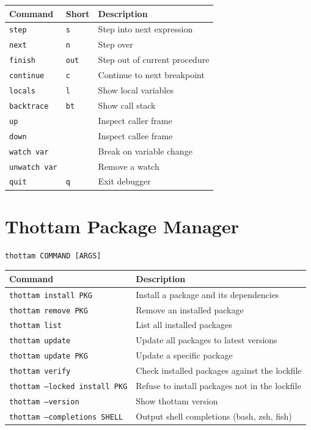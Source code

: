 \begin{center}
\small
\begin{tabularx}{\textwidth}{@{}llY@{}}
\textbf{Command} & \textbf{Short} & \textbf{Description} \\
\hline
\texttt{step} & \texttt{s} & Step into next expression \\
\texttt{next} & \texttt{n} & Step over \\
\texttt{finish} & \texttt{out} & Step out of current procedure \\
\texttt{continue} & \texttt{c} & Continue to next breakpoint \\
\texttt{locals} & \texttt{l} & Show local variables \\
\texttt{backtrace} & \texttt{bt} & Show call stack \\
\texttt{up} & & Inspect caller frame \\
\texttt{down} & & Inspect callee frame \\
\texttt{watch var} & & Break on variable change \\
\texttt{unwatch var} & & Remove a watch \\
\texttt{quit} & \texttt{q} & Exit debugger \\
\end{tabularx}
\end{center}

\section{Thottam Package Manager}

\begin{Verbatim}[fontsize=\small]
thottam COMMAND [ARGS]
\end{Verbatim}

\begin{center}
\small
\begin{tabularx}{\textwidth}{@{}lY@{}}
\textbf{Command} & \textbf{Description} \\
\hline
\texttt{thottam install PKG} & Install a package and its dependencies \\
\texttt{thottam remove PKG} & Remove an installed package \\
\texttt{thottam list} & List all installed packages \\
\texttt{thottam update} & Update all packages to latest versions \\
\texttt{thottam update PKG} & Update a specific package \\
\texttt{thottam verify} & Check installed packages against the lockfile \\
\texttt{thottam --locked install PKG} & Refuse to install packages not in the lockfile \\
\texttt{thottam --version} & Show thottam version \\
\texttt{thottam --completions SHELL} & Output shell completions (bash, zsh, fish) \\
\end{tabularx}
\end{center}

